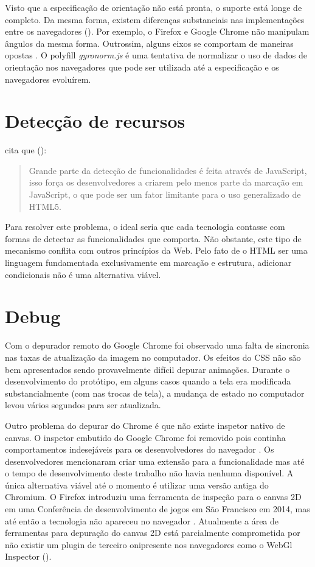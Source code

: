Visto que a especificação de orientação não está pronta,
o suporte está longe de completo. Da mesma forma, existem
diferenças substanciais nas implementações entre os navegadores
(). Por exemplo, o Firefox e Google
Chrome não manipulam ângulos da mesma forma. Outrossim, alguns
eixos se comportam de maneiras opostas \textsc{\autocite{mdnOrientation}}. O
polyfill \textit{gyronorm.js} é uma tentativa de normalizar o uso de
dados de orientação nos navegadores que pode ser utilizada até a
especificação e os navegadores evoluírem.

\section{Detecção de recursos}

\citet{diveIntohtml} cita que ():
\begin{quote}
Grande parte da detecção de funcionalidades é feita através de
JavaScript, isso força os desenvolvedores a criarem pelo menos parte da
marcação em JavaScript, o que pode ser um fator limitante para o uso
generalizado de HTML5.
\end{quote}

Para resolver este problema, o ideal seria que cada tecnologia contasse
com formas de detectar as funcionalidades que comporta. Não obstante,
este tipo de mecanismo conflita com outros princípios da Web. Pelo
fato de o HTML ser uma linguagem fundamentada exclusivamente em marcação
e estrutura, adicionar condicionais não é uma alternativa
viável.

\section{Debug}

Com o depurador remoto do Google Chrome foi observado uma falta de
sincronia nas taxas de atualização da imagem no computador. Os efeitos
do CSS não são bem apresentados sendo provavelmente difícil depurar
animações. Durante o desenvolvimento do protótipo, em alguns casos
quando a tela era modificada substancialmente (com nas trocas de tela),
a mudança de estado no computador levou vários segundos para ser
atualizada.

Outro problema do depurar do Chrome é que não existe inspetor
nativo de canvas. O inspetor embutido do Google Chrome foi
removido pois continha comportamentos indesejáveis para os
desenvolvedores do navegador \textsc{\autocite{canvasinspector}}. Os
desenvolvedores mencionaram criar uma extensão para a funcionalidade
mas até o tempo de desenvolvimento deste trabalho não havia
nenhuma disponível. A única alternativa viável até o momento é
utilizar uma versão antiga do Chromium. O Firefox introduziu uma
ferramenta de inspeção para o canvas 2D em uma Conferência de
desenvolvimento de jogos em São Francisco em 2014, mas até então a
tecnologia não apareceu no navegador \textsc{\autocite{firefoxCanvasDebug}}.
Atualmente a área de ferramentas para depuração do canvas
2D está parcialmente comprometida por não existir um plugin
de terceiro onipresente nos navegadores como o WebGl Inspector
().

